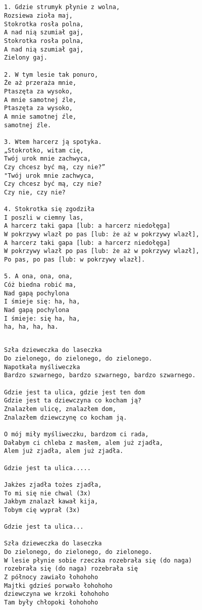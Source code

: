 \documentclass[12pt]{article}
\begin{document}
\subsection*{}
\begin{verbatim}
1. Gdzie strumyk płynie z wolna,
Rozsiewa zioła maj,
Stokrotka rosła polna,
A nad nią szumiał gaj,
Stokrotka rosła polna,
A nad nią szumiał gaj,
Zielony gaj.

2. W tym lesie tak ponuro,
Że aż przeraża mnie,
Ptaszęta za wysoko,
A mnie samotnej źle,
Ptaszęta za wysoko,
A mnie samotnej źle,
samotnej źle.

3. Wtem harcerz ją spotyka.
„Stokrotko, witam cię,
Twój urok mnie zachwyca,
Czy chcesz być mą, czy nie?”
"Twój urok mnie zachwyca,
Czy chcesz być mą, czy nie?
Czy nie, czy nie?

4. Stokrotka się zgodziła
I poszli w ciemny las,
A harcerz taki gapa [lub: a harcerz niedołęga]
W pokrzywy wlazł po pas [lub: że aż w pokrzywy wlazł],
A harcerz taki gapa [lub: a harcerz niedołęga]
W pokrzywy wlazł po pas [lub: że aż w pokrzywy wlazł],
Po pas, po pas [lub: w pokrzywy wlazł].

5. A ona, ona, ona,
Cóż biedna robić ma,
Nad gapą pochylona
I śmieje się: ha, ha,
Nad gapą pochylona
I śmieje: się ha, ha,
ha, ha, ha, ha.
\end{verbatim}
\clearpage

\subsection*{}
\begin{verbatim}
Szła dzieweczka do laseczka
Do zielonego, do zielonego, do zielonego.
Napotkała myśliweczka
Bardzo szwarnego, bardzo szwarnego, bardzo szwarnego.

Gdzie jest ta ulica, gdzie jest ten dom
Gdzie jest ta dziewczyna co kocham ją?
Znalazłem ulicę, znalazłem dom,
Znalazłem dziewczynę co kocham ją.

O mój miły myśliweczku, bardzom ci rada,
Dałabym ci chleba z masłem, alem już zjadła,
Alem już zjadła, alem już zjadła.

Gdzie jest ta ulica.....

Jakżes zjadła tożes zjadła,
To mi się nie chwal (3x)
Jakbym znalazł kawał kija,
Tobym cię wyprał (3x)

Gdzie jest ta ulica...

Szła dzieweczka do laseczka
Do zielonego, do zielonego, do zielonego.
W lesie płynie sobie rzeczka rozebrała się (do naga)
rozebrała się (do naga) rozebrała się
Z północy zawiało łohohoho
Majtki gdzieś porwało łohohoho
dziewczyna we krzoki łohohoho
Tam były chłopoki łohohoho
\end{verbatim}
\clearpage
\end{document}
